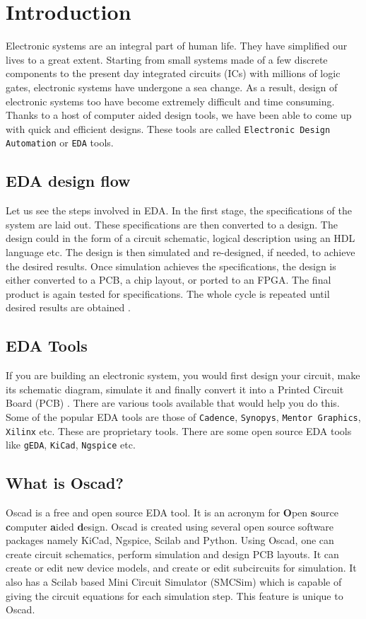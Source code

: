 
%


\chapter{Introduction}

Electronic systems are an integral part of human life. They have simplified our lives to a great extent. Starting from small systems made of a few discrete components to the present day integrated circuits (ICs) with millions of logic gates, electronic systems have undergone a sea change. As a result, design of electronic systems too have become extremely difficult and time consuming. Thanks to a host of computer aided design tools, we have been able to come up with quick and efficient designs. These tools are called {\tt Electronic Design Automation} or {\tt EDA} tools.
\section {EDA design flow}
Let us see the steps involved in EDA. In the first stage, the specifications of the system are laid out. These specifications are then converted to a design. The design could in the form of a circuit schematic, logical description using an HDL language etc. The design is then simulated and re-designed, if needed, to achieve the desired results. Once simulation achieves the specifications, the design is either converted to a PCB, a chip layout, or ported to an FPGA. The final product is again tested for specifications. The whole cycle is repeated until desired results are obtained \cite{eda}.
\section{EDA Tools}
If you are building an electronic system, you would first design your circuit, make its schematic diagram, simulate it and finally convert it into a Printed Circuit Board (PCB) . There are various tools available that would help you do this. Some of the popular EDA tools are those of {\tt Cadence}, {\tt Synopys}, {\tt Mentor Graphics}, {\tt Xilinx} etc. These are proprietary tools. There are some open source EDA tools like {\tt gEDA}, {\tt KiCad}, {\tt Ngspice} etc. 
\section{What is Oscad?}
Oscad is a free and open source EDA tool. It is an acronym for \textbf{O}pen \textbf{s}ource \textbf{c}omputer \textbf{a}ided \textbf{d}esign. Oscad is created using several open source software packages namely KiCad, Ngspice, Scilab and Python. Using Oscad, one can create circuit schematics, perform simulation and design PCB layouts. It can create or edit new device models, and create or edit subcircuits for simulation. It also has a Scilab based Mini Circuit Simulator (SMCSim) which is
capable of giving the circuit equations for each simulation step. This feature is unique to Oscad. 
